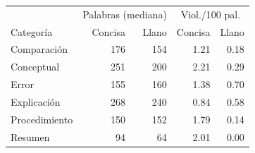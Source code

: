 \begin{tabular}{lrrrr}
\toprule
 & \multicolumn{2}{c}{Palabras (mediana)} & \multicolumn{2}{c}{Viol./100 pal.} \\
Categoría & Concisa & Llano & Concisa & Llano \\
\midrule
Comparación & 176 & 154 & 1.21 & 0.18 \\
Conceptual & 251 & 200 & 2.21 & 0.29 \\
Error & 155 & 160 & 1.38 & 0.70 \\
Explicación & 268 & 240 & 0.84 & 0.58 \\
Procedimiento & 150 & 152 & 1.79 & 0.14 \\
Resumen & 94 & 64 & 2.01 & 0.00 \\
\bottomrule
\end{tabular}
